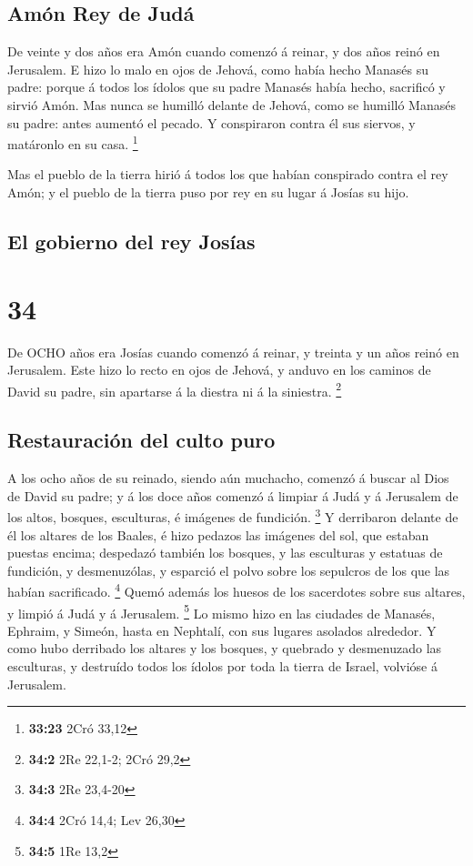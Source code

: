 \hypertarget{amuxf3n-rey-de-juduxe1}{%
\subsection{Amón Rey de Judá}\label{amuxf3n-rey-de-juduxe1}}

 De veinte y dos años era Amón cuando comenzó á reinar, y
dos años reinó en Jerusalem.  E hizo lo malo en ojos de
Jehová, como había hecho Manasés su padre: porque á todos los ídolos que
su padre Manasés había hecho, sacrificó y sirvió Amón.  Mas
nunca se humilló delante de Jehová, como se humilló Manasés su padre:
antes aumentó el pecado.  Y conspiraron contra él sus
siervos, y matáronlo en su casa. \footnote{\textbf{33:23} 2Cró 33,12}

 Mas el pueblo de la tierra hirió á todos los que habían
conspirado contra el rey Amón; y el pueblo de la tierra puso por rey en
su lugar á Josías su hijo. 

\hypertarget{el-gobierno-del-rey-josuxedas}{%
\subsection{El gobierno del rey
Josías}\label{el-gobierno-del-rey-josuxedas}}

\hypertarget{section-33}{%
\section{34}\label{section-33}}

 De OCHO años era Josías cuando comenzó á reinar, y treinta
y un años reinó en Jerusalem.  Este hizo lo recto en ojos de
Jehová, y anduvo en los caminos de David su padre, sin apartarse á la
diestra ni á la siniestra. \footnote{\textbf{34:2} 2Re 22,1-2; 2Cró 29,2}

\hypertarget{restauraciuxf3n-del-culto-puro}{%
\subsection{Restauración del culto
puro}\label{restauraciuxf3n-del-culto-puro}}

 A los ocho años de su reinado, siendo aún muchacho, comenzó
á buscar al Dios de David su padre; y á los doce años comenzó á limpiar
á Judá y á Jerusalem de los altos, bosques, esculturas, é imágenes de
fundición. \footnote{\textbf{34:3} 2Re 23,4-20}  Y
derribaron delante de él los altares de los Baales, é hizo pedazos las
imágenes del sol, que estaban puestas encima; despedazó también los
bosques, y las esculturas y estatuas de fundición, y desmenuzólas, y
esparció el polvo sobre los sepulcros de los que las habían sacrificado.
\footnote{\textbf{34:4} 2Cró 14,4; Lev 26,30}  Quemó además
los huesos de los sacerdotes sobre sus altares, y limpió á Judá y á
Jerusalem. \footnote{\textbf{34:5} 1Re 13,2}  Lo mismo hizo
en las ciudades de Manasés, Ephraim, y Simeón, hasta en Nephtalí, con
sus lugares asolados alrededor.  Y como hubo derribado los
altares y los bosques, y quebrado y desmenuzado las esculturas, y
destruído todos los ídolos por toda la tierra de Israel, volvióse á
Jerusalem.

